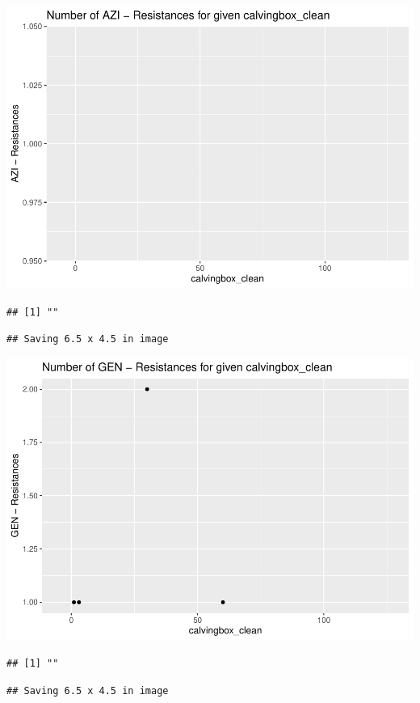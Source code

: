 \documentclass[
]{article}
\begin{document}
\includegraphics{NResistenzen_files/figure-latex/numerical_variables-23.pdf}

\begin{verbatim}
## [1] ""
\end{verbatim}

\begin{verbatim}
## Saving 6.5 x 4.5 in image
\end{verbatim}

\includegraphics{NResistenzen_files/figure-latex/numerical_variables-24.pdf}

\begin{verbatim}
## [1] ""
\end{verbatim}

\begin{verbatim}
## Saving 6.5 x 4.5 in image
\end{verbatim}
\end{document}
